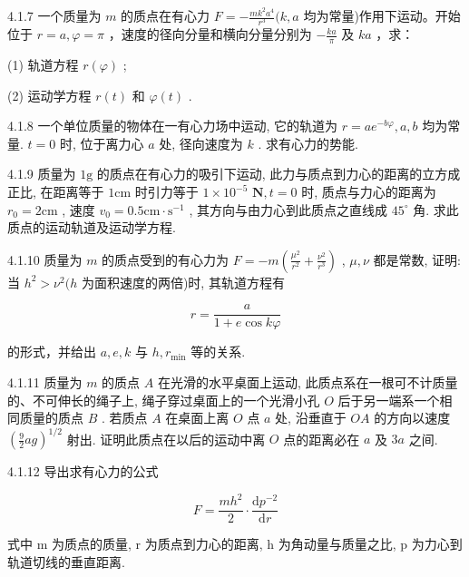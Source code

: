 \begin{problem}{4.1.7}
一个质量为 $m$ 的质点在有心力 $F = -\frac{mk^2a^4}{r^3} (k, a$ 均为常量)作用下运动。开始位于 $r = a, \varphi = \pi$ ，速度的径向分量和横向分量分别为 $-\frac{ka}{\pi}$ 及 $ka$ ，求：

(1) 轨道方程 $r(\varphi)$ ;

(2) 运动学方程 $r(t)$ 和 $\varphi(t)$ .
\end{problem}
\clearpage


\begin{problem}{4.1.8}
一个单位质量的物体在一有心力场中运动, 它的轨道为 $r = ae^{-b\varphi}, a, b$ 均为常量. $t = 0$ 时, 位于离力心 $a$ 处, 径向速度为 $k$ . 求有心力的势能.
\end{problem}
\clearpage


\begin{problem}{4.1.9}
质量为 $1\mathrm{g}$ 的质点在有心力的吸引下运动, 此力与质点到力心的距离的立方成正比, 在距离等于 $1\mathrm{cm}$ 时引力等于 $1 \times 10^{-5}$ $\mathbf{N}, t = 0$ 时, 质点与力心的距离为 $r_0 = 2\mathrm{cm}$ , 速度 $v_0 = 0.5\mathrm{cm} \cdot \mathrm{s}^{-1}$ , 其方向与由力心到此质点之直线成 $45^{\circ}$ 角. 求此质点的运动轨道及运动学方程.
\end{problem}
\clearpage


\begin{problem}{4.1.10}
质量为 $m$ 的质点受到的有心力为 $F = -m\left(\frac{\mu^2}{r^2} + \frac{\nu^2}{r^3}\right)$ , $\mu, \nu$ 都是常数, 证明: 当 $h^2 > \nu^2 (h$ 为面积速度的两倍)时, 其轨道方程有

\[
r = \frac {a}{1 + e \cos k \varphi}
\]

的形式，并给出 $a, e, k$ 与 $h, r_{\min}$ 等的关系.
\end{problem}
\clearpage


\begin{problem}{4.1.11}
质量为 $m$ 的质点 $A$ 在光滑的水平桌面上运动, 此质点系在一根可不计质量的、不可伸长的绳子上, 绳子穿过桌面上的一个光滑小孔 $O$ 后于另一端系一个相同质量的质点 $B$ . 若质点 $A$ 在桌面上离 $O$ 点 $a$ 处, 沿垂直于 $OA$ 的方向以速度 $\left(\frac{9}{2} ag\right)^{1/2}$ 射出. 证明此质点在以后的运动中离 $O$ 点的距离必在 $a$ 及 $3a$ 之间.
\end{problem}
\clearpage


\begin{problem}{4.1.12}
导出求有心力的公式

\[
F = \frac {m h ^ {2}}{2} \cdot \frac {\mathrm{d} p ^ {- 2}}{\mathrm{d} r}
\]

式中 m 为质点的质量, r 为质点到力心的距离, h 为角动量与质量之比, p 为力心到轨道切线的垂直距离.
\end{problem}
\clearpage


